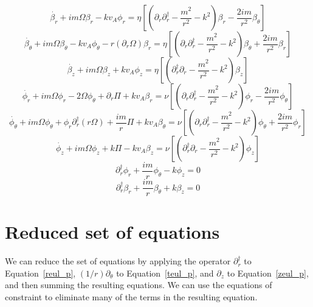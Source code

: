 \documentclass[letterpaper]{article}
\begin{document}
\begin{equation}\label{rind_p}
\dot{\beta_r} + im\Omega\beta_r - kv_A\phi_r = \eta\left[\left(\partial_r \partial_r^\dagger - \frac{m^2}{r^2} - k^2\right)\beta_r - \frac{2im}{r^2}\beta_\theta\right]
\end{equation}
\begin{equation}\label{tind_p}
\dot{\beta_\theta} + im\Omega\beta_\theta - kv_A \phi_\theta - r(\partial_r \Omega)\beta_r = \eta\left[\left(\partial_r \partial_r^\dagger - \frac{m^2}{r^2} - k^2\right)\beta_\theta + \frac{2im}{r^2}\beta_r\right]
\end{equation}
\begin{equation}\label{zind_p}
\dot{\beta_z} + im\Omega\beta_z + kv_A \phi_z = \eta\left[\left(\partial_r^\dagger \partial_r -\frac{m^2}{r^2} - k^2\right)\beta_z\right]
\end{equation}
\begin{equation}\label{reul_p}
\dot{\phi_r} + im\Omega\phi_r - 2\Omega\phi_\theta + \partial_r \Pi + kv_A\beta_r = \nu\left[\left(\partial_r \partial_r^\dagger - \frac{m^2}{r^2} - k^2\right)\phi_r - \frac{2im}{r^2}\phi_\theta\right]
\end{equation}
\begin{equation}\label{teul_p}
\dot{\phi_\theta} + im\Omega\phi_\theta + \phi_r \partial_r^\dagger(r\Omega) + \frac{im}{r}\Pi + kv_A \beta_\theta = \nu\left[\left(\partial_r \partial_r^\dagger - \frac{m^2}{r^2} - k^2\right)\phi_\theta + \frac{2im}{r^2}\phi_r\right]
\end{equation}
\begin{equation}\label{zeul_p}
\dot{\phi_z} + im\Omega{\phi_z} + k\Pi - kv_A \beta_z = \nu\left[\left(\partial_r^\dagger \partial_r - \frac{m^2}{r^2} - k^2\right)\phi_z\right]
\end{equation}
\begin{equation}\label{inc_p}
\partial_r^\dagger \phi_r + \frac{im}{r}\phi_\theta - k\phi_z = 0
\end{equation}
\begin{equation}\label{delB_p}
\partial_r^\dagger \beta_r + \frac{im}{r}\beta_\theta + k\beta_z = 0
\end{equation}

\section{Reduced set of equations}

We can reduce the set of equations by applying the operator $\partial_r^\dagger$ to Equation~\ref{reul_p}, $(1/r)\partial_\theta$ to Equation~\ref{teul_p}, and $\partial_z$ to Equation~\ref{zeul_p}, and then summing the resulting equations.  We can use the equations of constraint to eliminate many of the terms in the resulting equation.
\end{document}
